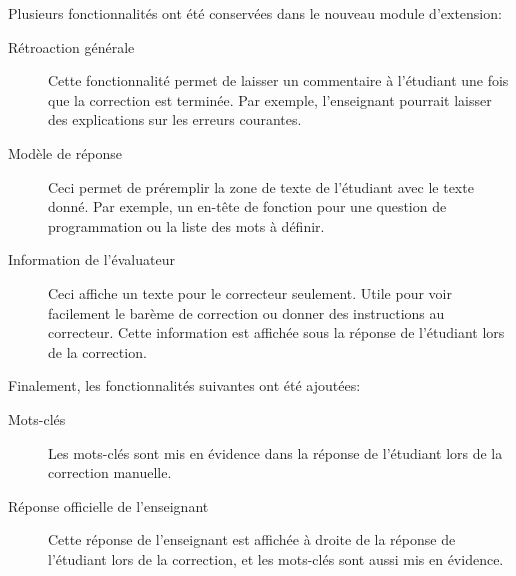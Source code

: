 Plusieurs fonctionnalit\'es ont \'et\'e conserv\'ees dans le nouveau module d'extension:
\begin{description}
  \item[R\'etroaction g\'en\'erale]
  
  Cette fonctionnalit\'e permet de laisser un commentaire \`a l'\'etudiant une fois que la correction est termin\'ee.
  Par exemple, l'enseignant pourrait laisser des explications sur les erreurs courantes.
  
  \item[Mod\`ele de r\'eponse]
  
  Ceci permet de pr\'eremplir la zone de texte de l'\'etudiant avec le texte donn\'e.
  Par exemple, un en-t\^ete de fonction pour une question de programmation ou la liste des mots \`a d\'efinir.
  
  \item[Information de l'\'evaluateur]
  
  Ceci affiche un texte pour le correcteur seulement.
  Utile pour voir facilement le bar\`eme de correction ou donner des instructions au correcteur.
  Cette information est affich\'ee sous la r\'eponse de l'\'etudiant lors de la correction.
\end{description}
Finalement, les fonctionnalit\'es suivantes ont \'et\'e ajout\'ees:
\begin{description}
  \item[Mots-cl\'es]
  
  Les mots-cl\'es sont mis en \'evidence dans la r\'eponse de l'\'etudiant lors de la correction manuelle.
  \item[R\'eponse officielle de l'enseignant]
  
  Cette r\'eponse de l'enseignant est 
  affich\'ee \`a droite de la r\'eponse de l'\'etudiant lors de la correction, et
  les mots-cl\'es sont aussi mis en \'evidence.
\end{description}

